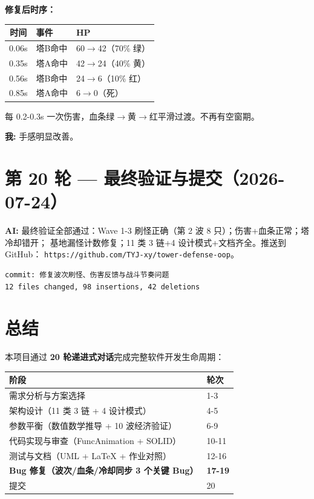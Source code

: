 \documentclass[12pt,a4paper]{ctexart}
\begin{document}
\textbf{修复后时序：}
\begin{center}
\begin{tabular}{cll}
\toprule
时间 & 事件 & HP \\
\midrule
0.06s & 塔B命中 & 60$\rightarrow$42（70\% 绿）\\
0.35s & 塔A命中 & 42$\rightarrow$24（40\% 黄）\\
0.56s & 塔B命中 & 24$\rightarrow$6（10\% 红）\\
0.85s & 塔A命中 & 6$\rightarrow$0（死）\\
\bottomrule
\end{tabular}
\end{center}

每 0.2-0.3s 一次伤害，血条绿$\rightarrow$黄$\rightarrow$红平滑过渡。不再有空窗期。

\textbf{我:} 手感明显改善。

\section*{第 20 轮 — 最终验证与提交（2026-07-24）}

\textbf{AI:} 最终验证全部通过：Wave 1-3 刷怪正确（第 2 波 8 只）；伤害+血条正常；塔冷却错开；
基地漏怪计数修复；11 类 3 链+4 设计模式+文档齐全。推送到 GitHub：
\texttt{https://github.com/TYJ-xy/tower-defense-oop}。

\vspace{0.5em}
\begin{verbatim}
commit: 修复波次刷怪、伤害反馈与战斗节奏问题
12 files changed, 98 insertions, 42 deletions
\end{verbatim}

\section*{总结}

本项目通过 \textbf{20 轮递进式对话}完成完整软件开发生命周期：

\begin{center}
\begin{tabular}{ll}
\toprule
阶段 & 轮次 \\
\midrule
需求分析与方案选择 & 1-3 \\
架构设计（11 类 3 链 + 4 设计模式） & 4-5 \\
参数平衡（数值数学推导 + 10 波经济验证） & 6-9 \\
代码实现与审查（FuncAnimation + SOLID） & 10-11 \\
测试与文档（UML + LaTeX + 作业对照） & 12-16 \\
\textbf{Bug 修复（波次/血条/冷却同步 3 个关键 Bug）} & \textbf{17-19} \\
提交 & 20 \\
\bottomrule
\end{tabular}
\end{center}
\end{document}

